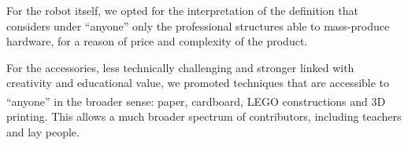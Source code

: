 \documentclass[letterpaper, 10 pt, conference]{ieeeconf}  %
\begin{document}
For the robot itself, we opted for the interpretation of the definition that considers under ``anyone'' only the professional structures able to mass-produce hardware, for a reason of price and complexity of the product. 

For the accessories, less technically challenging and stronger linked with creativity and educational value, we promoted techniques that are accessible to ``anyone'' in the broader sense: paper, cardboard, LEGO\textsuperscript{\textregistered} constructions and 3D printing. %
This allows a much broader spectrum of contributors, including teachers and lay people.

\end{document}
